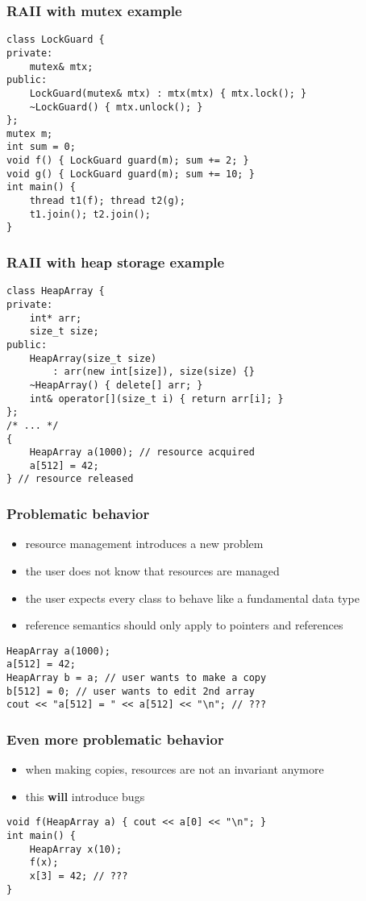 \begin{frame}[fragile]
    \frametitle{RAII with mutex example}
    \begin{lstlisting}[numbers=none]
class LockGuard {
private:
    mutex& mtx;
public:
    LockGuard(mutex& mtx) : mtx(mtx) { mtx.lock(); }
    ~LockGuard() { mtx.unlock(); }
};
mutex m;
int sum = 0;
void f() { LockGuard guard(m); sum += 2; }
void g() { LockGuard guard(m); sum += 10; }
int main() {
    thread t1(f); thread t2(g);
    t1.join(); t2.join();
}
    \end{lstlisting}
\end{frame}
\begin{frame}[fragile]
    \frametitle{RAII with heap storage example}
    \begin{lstlisting}
class HeapArray {
private:
    int* arr;
    size_t size;
public:
    HeapArray(size_t size)
        : arr(new int[size]), size(size) {}
    ~HeapArray() { delete[] arr; }
    int& operator[](size_t i) { return arr[i]; }
};
/* ... */
{
    HeapArray a(1000); // resource acquired
    a[512] = 42;
} // resource released
    \end{lstlisting}
\end{frame}

\begin{frame}[fragile]
    \frametitle{Problematic behavior}
    \begin{itemize}
        \item resource management introduces a new problem
        \item the user does not know that resources are managed
        \item the user expects every class to behave like a fundamental data type
        \item reference semantics should only apply to pointers and references
    \end{itemize}
    \begin{lstlisting}[numbers=none]
HeapArray a(1000);
a[512] = 42;
HeapArray b = a; // user wants to make a copy
b[512] = 0; // user wants to edit 2nd array
cout << "a[512] = " << a[512] << "\n"; // ???
    \end{lstlisting}
\end{frame}

\begin{frame}[fragile]
    \frametitle{Even more problematic behavior}
    \begin{itemize}
        \item when making copies, resources are not an invariant anymore
        \item this \textbf{will} introduce bugs
    \end{itemize}
    \begin{lstlisting}[numbers=none]
void f(HeapArray a) { cout << a[0] << "\n"; }
int main() {
    HeapArray x(10);
    f(x);
    x[3] = 42; // ???
}
    \end{lstlisting}
\end{frame}

